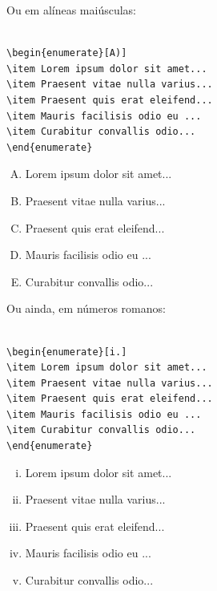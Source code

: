 \documentclass[12pt,A4,A4pt]{article}
\begin{document}
Ou em alíneas maiúsculas:

\begin{verbatim}
    
\begin{enumerate}[A)]
\item Lorem ipsum dolor sit amet...
\item Praesent vitae nulla varius...
\item Praesent quis erat eleifend...
\item Mauris facilisis odio eu ...
\item Curabitur convallis odio...
\end{enumerate}

\end{verbatim}

\begin{enumerate}[A)]   
\item Lorem ipsum dolor sit amet...
\item Praesent vitae nulla varius...
\item Praesent quis erat eleifend...
\item Mauris facilisis odio eu ...
\item Curabitur convallis odio...
\end{enumerate}

Ou ainda, em números romanos:

\begin{verbatim}
    
\begin{enumerate}[i.]
\item Lorem ipsum dolor sit amet...
\item Praesent vitae nulla varius...
\item Praesent quis erat eleifend...
\item Mauris facilisis odio eu ...
\item Curabitur convallis odio...
\end{enumerate}

\end{verbatim}

\begin{enumerate}[i.]
\item Lorem ipsum dolor sit amet...
\item Praesent vitae nulla varius...
\item Praesent quis erat eleifend...
\item Mauris facilisis odio eu ...
\item Curabitur convallis odio...
\end{enumerate}
\end{document}

